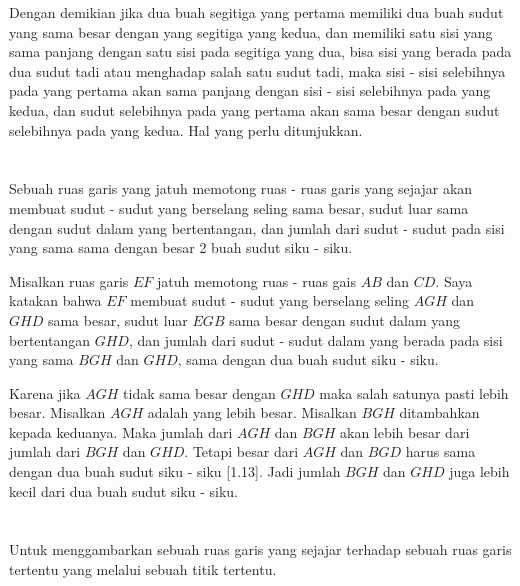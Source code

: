 \documentclass[a4paper]{book}
\begin{document}
Dengan demikian jika dua buah segitiga yang pertama memiliki dua buah sudut yang sama besar
dengan yang segitiga yang kedua, dan memiliki satu sisi yang sama panjang dengan
satu sisi pada segitiga yang dua, bisa sisi yang berada pada dua sudut tadi atau
menghadap salah satu sudut tadi, maka sisi - sisi selebihnya pada yang 
pertama akan sama panjang dengan sisi - sisi selebihnya pada yang kedua, dan 
sudut selebihnya pada yang pertama akan sama besar dengan sudut selebihnya pada
yang kedua. Hal yang perlu ditunjukkan.  

\setcounter{section}{29}
\section*{\centering \thesection} 
Sebuah ruas garis yang jatuh memotong ruas - ruas garis yang sejajar akan membuat
sudut - sudut yang berselang seling sama besar, sudut luar sama dengan sudut dalam
yang bertentangan, dan jumlah dari sudut - sudut pada sisi yang sama sama dengan
besar 2 buah sudut siku - siku.  


Misalkan ruas garis $EF$ jatuh memotong ruas - ruas gais $AB$ dan $CD$. 
Saya katakan bahwa $EF$ membuat sudut - sudut yang berselang seling 
$AGH$ dan $GHD$ sama besar, sudut luar $EGB$ sama besar dengan sudut dalam
yang bertentangan $GHD$, dan jumlah dari sudut - sudut dalam yang berada 
pada sisi yang sama $BGH$ dan $GHD$, sama dengan dua buah sudut siku - siku.

Karena jika $AGH$ tidak sama besar dengan $GHD$ maka salah satunya pasti
lebih besar. Misalkan $AGH$ adalah yang lebih besar. Misalkan $BGH$ 
ditambahkan kepada keduanya. Maka jumlah dari $AGH$ dan $BGH$ akan 
lebih besar dari jumlah dari $BGH$ dan $GHD$. Tetapi besar dari $AGH$
dan $BGD$ harus sama dengan dua buah sudut siku - siku [1.13]. Jadi
jumlah $BGH$ dan $GHD$ juga lebih kecil dari dua buah sudut siku - siku.

\setcounter{section}{31}
\section*{\centering \thesection} 
Untuk menggambarkan sebuah ruas garis yang sejajar terhadap sebuah ruas 
garis tertentu yang melalui sebuah titik tertentu.
\end{document}
